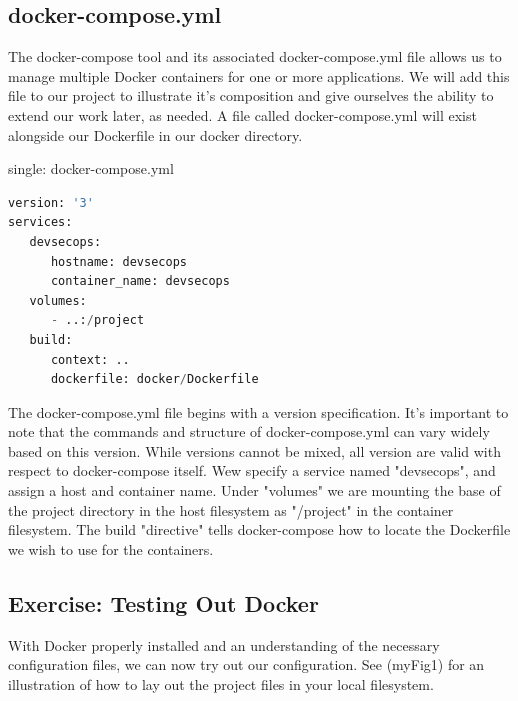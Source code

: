 \subsection{docker-compose.yml}
\justify
The docker-compose tool and its associated docker-compose.yml file
allows us to manage multiple Docker containers for one or more
applications. We will add this file to our project to illustrate it's
composition and give ourselves the ability to extend our work later, as
needed.
\justify
A file called docker-compose.yml will exist alongside our Dockerfile in our docker directory.

single: docker-compose.yml

\begin{lstlisting}[language=Python]
version: '3'
services:
   devsecops:
      hostname: devsecops
      container_name: devsecops
   volumes:
      - ..:/project
   build:
      context: ..
      dockerfile: docker/Dockerfile
\end{lstlisting}
\justify
The docker-compose.yml file begins with a version specification. It's
important to note that the commands and structure of docker-compose.yml
can vary widely based on this version. While versions cannot be mixed,
all version are valid with respect to docker-compose itself. Wew specify
a service named "devsecops", and assign a host and container name. Under
"volumes" we are mounting the base of the project directory in the host
filesystem as "/project" in the container filesystem. The build
"directive" tells docker-compose how to locate the Dockerfile we wish to
use for the containers.

\subsection{Exercise: Testing Out Docker}
\justify
With Docker properly installed and an understanding of the necessary
configuration files, we can now try out our configuration. See
({myFig1}) for an illustration of how to lay out the project files in your local filesystem.


